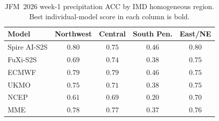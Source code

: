 \begin{table}[t]
  \centering
  \caption{JFM~2026 week-1 precipitation ACC by IMD homogeneous region. Best individual-model score in each column is bold.}
  \label{tab:reg_jfm_tp_w1}
  \small
  \begin{tabular}{lcccc}
    \toprule
    Model & Northwest & Central & South Pen. & East/NE \\
    \midrule
    Spire AI-S2S   & $\mathbf{0.80}$ & $0.75$ & $\mathbf{0.46}$ & $\mathbf{0.80}$ \\
FuXi-S2S       & $0.69$ & $0.74$ & $0.38$ & $0.75$ \\
ECMWF          & $0.79$ & $\mathbf{0.79}$ & $0.46$ & $0.75$ \\
UKMO           & $0.75$ & $0.71$ & $0.38$ & $0.75$ \\
NCEP           & $0.61$ & $0.69$ & $0.20$ & $0.70$ \\
MME            & $0.78$ & $0.77$ & $0.37$ & $0.76$ \\
    \bottomrule
  \end{tabular}
\end{table}
